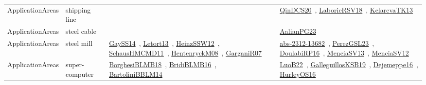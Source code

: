 {\begin{longtable}{lp{3cm}>{\raggedright\arraybackslash}p{6cm}>{\raggedright\arraybackslash}p{6cm}>{\raggedright\arraybackslash}p{8cm}}
ApplicationAreas & shipping line &  &  & \href{../works/QinDCS20.pdf}{QinDCS20}~\cite{QinDCS20}, \href{../works/LaborieRSV18.pdf}{LaborieRSV18}~\cite{LaborieRSV18}, \href{../works/KelarevaTK13.pdf}{KelarevaTK13}~\cite{KelarevaTK13}\\
ApplicationAreas & steel cable &  &  & \href{../works/AalianPG23.pdf}{AalianPG23}~\cite{AalianPG23}\\
ApplicationAreas & steel mill & \href{../works/GaySS14.pdf}{GaySS14}~\cite{GaySS14}, \href{../works/Letort13.pdf}{Letort13}~\cite{Letort13}, \href{../works/HeinzSSW12.pdf}{HeinzSSW12}~\cite{HeinzSSW12}, \href{../works/SchausHMCMD11.pdf}{SchausHMCMD11}~\cite{SchausHMCMD11}, \href{../works/HentenryckM08.pdf}{HentenryckM08}~\cite{HentenryckM08}, \href{../works/GarganiR07.pdf}{GarganiR07}~\cite{GarganiR07} &  & \href{../works/abs-2312-13682.pdf}{abs-2312-13682}~\cite{abs-2312-13682}, \href{../works/PerezGSL23.pdf}{PerezGSL23}~\cite{PerezGSL23}, \href{../works/DoulabiRP16.pdf}{DoulabiRP16}~\cite{DoulabiRP16}, \href{../works/MenciaSV13.pdf}{MenciaSV13}~\cite{MenciaSV13}, \href{../works/MenciaSV12.pdf}{MenciaSV12}~\cite{MenciaSV12}\\
ApplicationAreas & super-computer & \href{../works/BorghesiBLMB18.pdf}{BorghesiBLMB18}~\cite{BorghesiBLMB18}, \href{../works/BridiBLMB16.pdf}{BridiBLMB16}~\cite{BridiBLMB16}, \href{../works/BartoliniBBLM14.pdf}{BartoliniBBLM14}~\cite{BartoliniBBLM14} &  & \href{../works/LuoB22.pdf}{LuoB22}~\cite{LuoB22}, \href{../works/GalleguillosKSB19.pdf}{GalleguillosKSB19}~\cite{GalleguillosKSB19}, \href{../works/Dejemeppe16.pdf}{Dejemeppe16}~\cite{Dejemeppe16}, \href{../works/HurleyOS16.pdf}{HurleyOS16}~\cite{HurleyOS16}\\

\end{longtable}}
